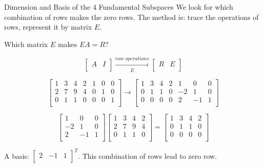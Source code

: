 \documentclass{beamer}
\begin{document}
\begin{frame}{Dimension and Basis of the 4 Fundamental Subspaces}
We look for which combination of rows makes the zero rows. The method is: trace the operations of rows, represent it by matrix $E$.

\vspace{3pt}
Which matrix $E$ makes $EA=R$?

\begin{equation*}
    \left[ \begin{matrix}
        A&		I\\
    \end{matrix} \right] \xrightarrow[E]{row\,\,operations}\left[ \begin{matrix}
        R&		E\\
    \end{matrix} \right]
\end{equation*}

\begin{equation*}
    \left[ \begin{matrix}
        1&		3&		4&		2&		1&		0&		0\\
        2&		7&		9&		4&		0&		1&		0\\
        0&		1&		1&		0&		0&		0&		1\\
    \end{matrix} \right] \rightarrow \left[ \begin{matrix}
        1&		3&		4&		2&		1&		0&		0\\
        0&		1&		1&		0&		-2&		1&		0\\
        0&		0&		0&		0&		2&		-1&		1\\
    \end{matrix} \right]
\end{equation*}

\begin{equation*}
    \left[ \begin{matrix}
        1&		0&		0\\
        -2&		1&		0\\
        2&		-1&		1\\
    \end{matrix} \right] \left[ \begin{matrix}
        1&		3&		4&		2\\
        2&		7&		9&		4\\
        0&		1&		1&		0\\
    \end{matrix} \right] =\left[ \begin{matrix}
        1&		3&		4&		2\\
        0&		1&		1&		0\\
        0&		0&		0&		0\\
    \end{matrix} \right]
\end{equation*}

A basis: $\left[ \begin{matrix}
	2&		-1&		1\\
\end{matrix} \right] ^T$. This combination of rows lead to zero row.
\end{frame}
\end{document}
